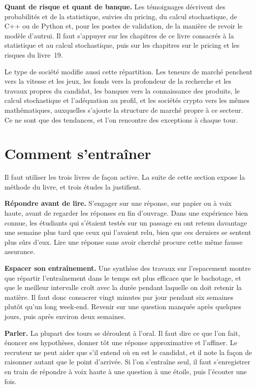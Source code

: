 \textbf{Quant de risque et quant de banque.} Les témoignages décrivent des probabilités et de la statistique, suivies du pricing, du calcul stochastique, de C++ ou de Python et, pour les postes de validation, de la manière de revoir le modèle d'autrui. Il faut s'appuyer sur les chapitres de ce livre consacrés à la statistique et au calcul stochastique, puis sur les chapitres sur le pricing et les risques du livre~19.

Le type de société modifie aussi cette répartition. Les teneurs de marché penchent vers la vitesse et les jeux, les fonds vers la profondeur de la recherche et les travaux propres du candidat, les banques vers la connaissance des produits, le calcul stochastique et l'adéquation au profil, et les sociétés crypto vers les mêmes mathématiques, auxquelles s'ajoute la structure de marché propre à ce secteur. Ce ne sont que des tendances, et l'on rencontre des exceptions à chaque tour.

\section{Comment s'entraîner}

Il faut utiliser les trois livres de façon active. La suite de cette section expose la méthode du livre, et trois études la justifient.

\textbf{Répondre avant de lire.} S'engager sur une réponse, sur papier ou à voix haute, avant de regarder les réponses en fin d'ouvrage. Dans une expérience bien connue, les étudiants qui s'étaient testés sur un passage en ont retenu davantage une semaine plus tard que ceux qui l'avaient relu, bien que ces derniers se sentent plus sûrs d'eux. Lire une réponse sans avoir cherché procure cette même fausse assurance.

\textbf{Espacer son entraînement.} Une synthèse des travaux sur l'espacement montre que répartir l'entraînement dans le temps est plus efficace que le bachotage, et que le meilleur intervalle croît avec la durée pendant laquelle on doit retenir la matière. Il faut donc consacrer vingt minutes par jour pendant six semaines plutôt qu'un long week-end. Revenir sur une question manquée après quelques jours, puis après environ deux semaines.

\textbf{Parler.} La plupart des tours se déroulent à l'oral. Il faut dire ce que l'on fait, énoncer ses hypothèses, donner tôt une réponse approximative et l'affiner. Le recruteur ne peut aider que s'il entend où en est le candidat, et il note la façon de raisonner autant que le point d'arrivée. Si l'on s'entraîne seul, il faut s'enregistrer en train de répondre à voix haute à une question à une étoile, puis l'écouter une fois.

